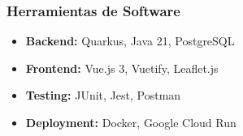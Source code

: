 \subsubsection{Herramientas de Software}
\begin{itemize}
    \item \textbf{Backend:} Quarkus, Java 21, PostgreSQL
    \item \textbf{Frontend:} Vue.js 3, Vuetify, Leaflet.js
    \item \textbf{Testing:} JUnit, Jest, Postman
    \item \textbf{Deployment:} Docker, Google Cloud Run
\end{itemize}
